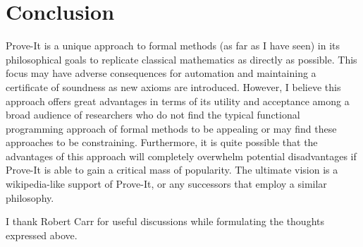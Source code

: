 \documentclass[12pt]{article}
\begin{document}
\section{Conclusion}

Prove-It is a unique approach to formal methods (as far as I have seen) in its philosophical goals to replicate classical mathematics as directly as possible.  This focus may have adverse consequences for automation and maintaining a certificate of soundness as new axioms are introduced.  However, I believe this approach offers great advantages in terms of its utility and acceptance among a broad audience of researchers who do not find the typical functional programming approach of formal methods to be appealing or may find these approaches to be constraining.  Furthermore, it is quite possible that the advantages of this approach will completely overwhelm potential disadvantages if Prove-It is able to gain a critical mass of popularity.  The ultimate vision is a wikipedia-like support of Prove-It, or any successors that employ a similar philosophy.

I thank Robert Carr for useful discussions while formulating the thoughts expressed above.
\end{document}
